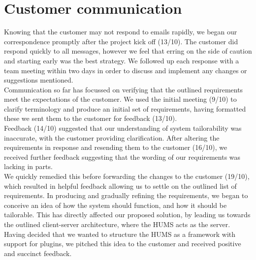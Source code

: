 \documentclass[10pt,a4paper]{article}
\begin{document}
\section{Customer communication}
Knowing that the customer may not respond to emails rapidly, we began our correspondence promptly after the project kick off (13/10). The customer did respond quickly to all messages, however we feel that erring on the side of caution and starting early was the best strategy. We followed up each response with a team meeting within two days in order to discuss and implement any changes or suggestions mentioned. \\
Communication so far has focussed on verifying that the outlined requirements meet the expectations of the customer. We used the initial meeting (9/10) to clarify terminology and produce an initial set of requirements,  having formatted these we sent them to the customer for feedback (13/10).  \\
Feedback (14/10) suggested that our understanding of system tailorability was inaccurate, with the customer providing clarification. After altering the requirements in response and resending them to the customer (16/10), we received further feedback suggesting that the wording of our requirements was lacking in parts. \\
We quickly remedied this before forwarding the changes to the customer (19/10), which resulted in helpful feedback allowing us to settle on the outlined list of requirements.
In producing and gradually refining the requirements, we began to conceive an idea of how the system should function, and how it should be tailorable. This has directly affected our proposed solution, by leading us towards the outlined client-server architecture, where the HUMS acts as the server. Having decided that we wanted to structure the HUMS as a framework with support for plugins, we pitched this idea to the customer and received positive and succinct feedback.
\\
\end{document}
